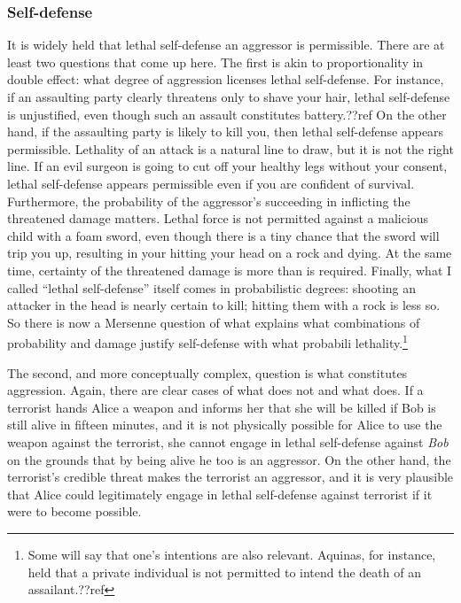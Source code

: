 \subsubsection{Self-defense}
It is widely held that lethal self-defense an aggressor is permissible. There are at least two questions that come up here.
The first is akin to proportionality in double effect: what degree of aggression licenses lethal self-defense. For instance, if an assaulting party clearly threatens only to shave your 
hair, lethal self-defense is unjustified, even though such an assault constitutes battery.??ref On the other hand, 
if the assaulting party is likely to kill you, then lethal self-defense appears permissible. 
Lethality of an attack is a natural line to draw, but it is not the right line. If an evil surgeon is going to 
cut off your healthy legs without your consent, lethal self-defense appears permissible even if 
you are confident of survival. Furthermore, the probability of the aggressor's succeeding in inflicting the 
threatened damage matters. Lethal force is not permitted against a malicious child with a foam sword, even though 
there is a tiny chance that the sword will trip you up, resulting in your hitting your head on a rock and dying. 
At the same time, certainty of the threatened damage is more than is required. Finally, what I called 
``lethal self-defense'' itself comes in probabilistic degrees: shooting an attacker in the head is nearly
certain to kill; hitting them with a rock is less so. So there is now a Mersenne question of 
what explains what combinations of probability and damage justify self-defense with what 
probabili lethality.\footnote{Some will say that one's intentions are also
relevant.  Aquinas, for instance, held that a private individual is not permitted to intend the death of 
an assailant.??ref}

The second, and more conceptually complex, question is what constitutes aggression. Again, there are clear cases of what does not 
and what does. If a terrorist hands Alice a weapon and informs her that she will be killed if Bob is still alive in fifteen 
minutes, and it is not physically possible for Alice to use the weapon against the terrorist, she cannot engage in lethal 
self-defense against \textit{Bob} on the grounds that by being alive he too is an aggressor. On the other hand, the terrorist's credible threat 
makes the terrorist an aggressor, and it is very plausible that Alice could legitimately engage in lethal self-defense against terrorist if it were 
to become possible.

